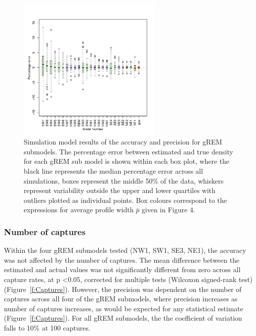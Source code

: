 \documentclass[a4paper,10pt,reqno,oneside]{amsart}
\begin{document}
\begin{figure}[t]
	\centering
	\includegraphics[width=7cm]{imgs/AverageModelBias.pdf}
       	\caption{Simulation model results of the accuracy and precision for gREM submodels. The percentage error between estimated and true density for each gREM sub model is shown within each box plot, where the black line represents the median percentage error across all simulations, boxes represent the middle 50\% of the data, whiskers represent variability outside the upper and lower quartiles with outliers plotted as individual points. Box colours correspond to the expressions for average profile width $\bar{p}$ given in Figure 4.        
} 
	\label{f:ModelBias}
\end{figure}

\subsubsection*{Number of captures}

Within the four gREM submodels tested (NW1, SW1, SE3, NE1), the  accuracy was not affected by the number of captures. The mean difference between the estimated and actual values was not significantly different from zero across all capture rates, at p \textless 0.05, corrected for multiple tests (Wilcoxon signed-rank test) (Figure~\ref{f:Captures}). However, the precision was dependent on the number of captures across all four of the gREM submodels, where precision increases as number of captures increases, as would be expected for any statistical estimate (Figure~\ref{f:Captures}). For all gREM submodels, the the coefficient of variation falls to 10\% at 100 captures. 
\end{document}
